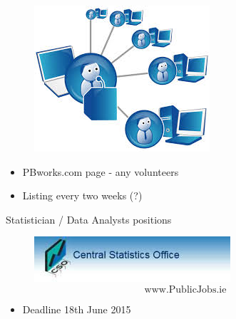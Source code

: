 \documentclass[PredictiveAnalytics101.tex]{subfiles}
\begin{document}
\begin{frame}
\vspace{-0.3cm}
\begin{figure}
\centering
\includegraphics[width=0.7\linewidth]{images/webinars}
\end{figure}
\Large
\begin{itemize}
	\item PBworks.com page - any volunteers
	\item Listing every two weeks (?)
\end{itemize}
	
\end{frame}
	\begin{frame}
		\Large
		Statistician / Data Analysts positions
		\begin{figure}
			\centering
			\includegraphics[width=0.99\linewidth]{images/CSOlogo}
			\[\mbox{www.PublicJobs.ie}\]
		\end{figure}
		\begin{itemize}
			\item Deadline 18th June 2015
		\end{itemize}
\end{frame}
\end{document}
